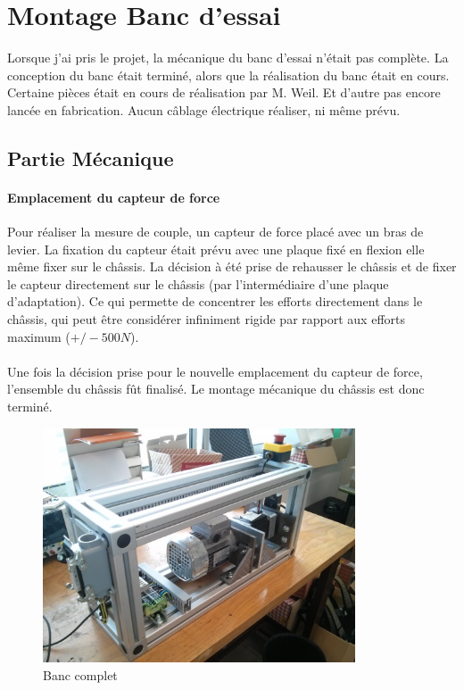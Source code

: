 \documentclass[11pt]{article}
\begin{document}

\section{Montage Banc d'essai}

Lorsque j'ai pris le projet, la mécanique du banc d'essai n'était pas complète. La conception du banc était terminé, alors que la réalisation du banc était en cours. Certaine pièces était en cours de réalisation par M. Weil. Et d'autre pas encore lancée en fabrication. Aucun câblage électrique réaliser, ni même prévu.

\subsection{Partie Mécanique}

\paragraph{Emplacement du capteur de force \\}

Pour réaliser la mesure de couple, un capteur de force placé avec un bras de levier. La fixation du capteur était prévu avec une plaque fixé en flexion elle même fixer sur le châssis. La décision à été prise de rehausser le châssis et de fixer le capteur directement sur le châssis (par l'intermédiaire d'une plaque d'adaptation). Ce qui permette de concentrer les efforts directement dans le châssis, qui peut être considérer infiniment rigide par rapport aux efforts maximum ($+/- 500 N$).\\
\\
Une fois la décision prise pour le nouvelle emplacement du capteur de force, l'ensemble du châssis fût finalisé. Le montage mécanique du châssis est donc terminé.

\begin{figure}[!h]
    \centering
    \includegraphics[width=350px]{IMG_20160628_183024.jpg}
    \caption{Banc complet}
\end{figure}
\end{document}
